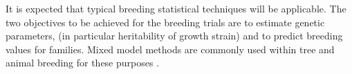 It
is expected that typical breeding statistical techniques will be applicable. The
two objectives to be achieved for the breeding trials are to estimate genetic
parameters, (in particular heritability of growth strain) and to predict
breeding values for families. Mixed model methods are commonly used within tree
and animal breeding for these purposes \cite{2007}.